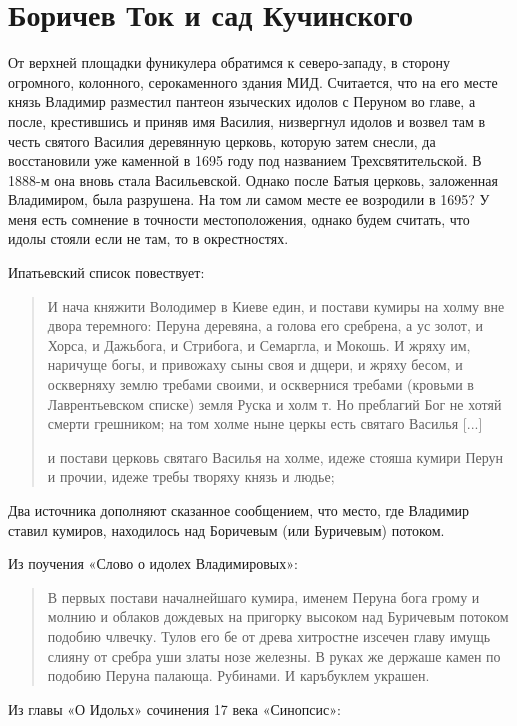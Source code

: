 \chapter {Боричев Ток и сад Кучинского}

От верхней площадки фуникулера обратимся к сев\-е\-ро-западу, в сторону огромного, колонного, серокаменного здания МИД. Считается, что на его месте князь Владимир разместил пантеон языческих идолов с Перуном во главе, а после, крестившись и приняв имя Василия, низвергнул идолов и возвел там в честь святого Василия деревянную церковь, которую затем снесли, да восстановили уже каменной в 1695 году под названием Трехсвятительской. В 1888-м она вновь стала Васильевской. Однако после Батыя церковь, заложенная Владимиром, была разрушена. На том ли самом месте ее возродили в 1695? У меня есть сомнение в точности местоположения, однако будем считать, что идолы стояли если не там, то в окрестностях.

Ипатьевский список повествует:

\begin{quotation}
И нача княжити Володимер в Киеве един, и постави кумиры на холму вне двора теремного: Перуна деревяна, а голова его сребрена, а ус золот, и Хорса, и Дажьбога, и Стрибога, и Семаргла, и Мокошь. И жряху им, наричуще богы, и привожаху сыны своя и дщери, и жряху бесом, и оскверняху землю требами своими, и осквернися требами (кровьми в Лаврентьевском списке) земля Руска и холм т. Но преблагий Бог не хотяй смерти грешником; на том холме ныне церкы есть святаго Василья [...]

и постави церковь святаго Василья на холме, идеже стояша кумири Перун и прочии, идеже требы творяху князь и людье;
\end{quotation}

Два источника дополняют сказанное сообщением, что место, где Владимир ставил кумиров, находилось над Боричевым (или Буричевым) потоком.

Из поучения «Слово о идолех Владимировых»: 

\begin{quotation}
В первых постави началнейшаго кумира, именем Перуна бога грому и молнию и облаков дождевых на пригорку высоком над Буричевым потоком подобию члвечку. Тулов его бе от древа хитростне изсечен главу имущь слияну от сребра уши златы нозе железны. В руках же держаше камен по подобию Перуна палающа. Рубинами. И каръбуклем украшен.
\end{quotation}

Из главы «О Идольх» сочинения 17 века «Синопсис»:

